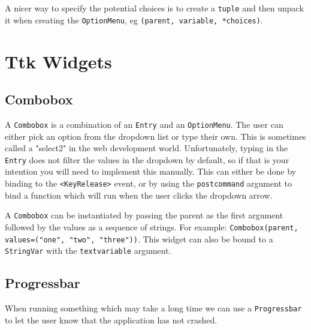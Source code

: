 \documentclass[a4paper,11pt,openany]{book}
\begin{document}
A nicer way to specify the potential choices is to create a \lstinline[columns=fixed]{tuple} and then unpack it when creating the \lstinline[columns=fixed]{OptionMenu}, eg \lstinline[columns=fixed]{(parent, variable, *choices)}.

\section{Ttk Widgets}

\subsection{Combobox}

A \lstinline[columns=fixed]{Combobox} is a combination of an \lstinline[columns=fixed]{Entry} and an \lstinline[columns=fixed]{OptionMenu}. The user can either pick an option from the dropdown list or type their own. This is sometimes called a "select2" in the web development world. Unfortunately, typing in the \lstinline[columns=fixed]{Entry} does not filter the values in the dropdown by default, so if that is your intention you will need to implement this manually. This can either be done by binding to the \lstinline[columns=fixed]{<KeyRelease>} event, or by using the \lstinline[columns=fixed]{postcommand} argument to bind a function which will run when the user clicks the dropdown arrow. 

\vspace{5mm}

A \lstinline[columns=fixed]{Combobox} can be instantiated by passing the parent as the first argument followed by the values as a sequence of strings. For example: \lstinline[columns=fixed]{Combobox(parent, values=("one", "two", "three"))}. This widget can also be bound to a \lstinline[columns=fixed]{StringVar} with the \lstinline[columns=fixed]{textvariable} argument. 

\subsection{Progressbar}

When running something which may take a long time we can use a \lstinline[columns=fixed]{Progressbar} to let the user know that the application has not crashed. 

\vspace{5mm}
\end{document}
